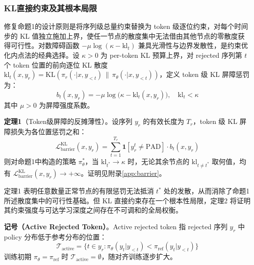 \documentclass[lettersize,journal]{IEEEtran}
\begin{document}
\subsubsection{KL直接约束及其根本局限}\label{sec:kl-barrier}
修复命题1的设计原则是将序列级总量约束替换为 token 级逐位约束，对每个时间步的 KL 值独立施加上界，使任一节点的散度集中无法借由其他节点的零散度获得可行性。对数障碍函数 $-\mu\log(\kappa - \mathrm{kl}_t)$ 兼具光滑性与边界发散性，是约束优化内点法的经典选择\cite{boyd2004convex}。设 $\kappa > 0$ 为 per-token KL 预算上界，对 rejected 序列第 $t$ 个 token 位置的前向逐位 KL 散度 $\mathrm{kl}_t(x, y_r) = \mathrm{KL}(\pi_r(\cdot|x, y_{<t}) \,\|\, \pi_\theta(\cdot|x, y_{<t}))$，定义 token 级 KL 屏障惩罚为：
\begin{equation}
    b_t(x, y_r) = -\mu \log\bigl(\kappa - \mathrm{kl}_t(x, y_r)\bigr),
    \quad \mathrm{kl}_t < \kappa
\end{equation}
其中 $\mu > 0$ 为屏障强度系数。

\textbf{定理1}（Token级屏障的反摊薄性）。设序列 $y_r$ 的有效长度为 $T_r$，token 级 KL 屏障损失为各位置惩罚之和：
\begin{equation}
    \mathcal{L}^{\text{KL}}_{\text{barrier}}(x, y_r) =
    \sum_{t=1}^{T_r} \mathbf{1}[y_r^t \neq \text{PAD}] \cdot b_t(x, y_r)
\end{equation}
则对命题1中构造的策略 $\pi_\theta^*$，当 $\mathrm{kl}_{t^*} \to \kappa$ 时，无论其余节点的 $\mathrm{kl}_{t \neq t^*}$ 取何值，均有 $\mathcal{L}^{\text{KL}}_{\text{barrier}}(x, y_r) \to +\infty$。证明见附录\ref{app:barrier}。

定理1 表明任意数量正常节点的有限惩罚无法抵消 $t^*$ 处的发散，从而消除了命题1所述散度集中的可行性基础。但 KL 直接约束存在一个根本性局限，定理2 将证明其约束强度与可达学习深度之间存在不可调和的全局权衡。

\textbf{记号（Active Rejected Token）}。Active rejected token 指 rejected 序列 $y_r$ 中 policy 分布低于参考分布的位置：
\begin{equation}\label{eq:active-def}
\mathcal{T}_{\text{active}} = \{t \in y_r : \pi_\theta(y_t|y_{<t}) < \pi_{\text{ref}}(y_t|y_{<t})\}
\end{equation}
训练初期 $\pi_\theta = \pi_{\text{ref}}$ 时 $\mathcal{T}_{\text{active}} = \emptyset$，随对齐训练逐步扩大。
\end{document}
